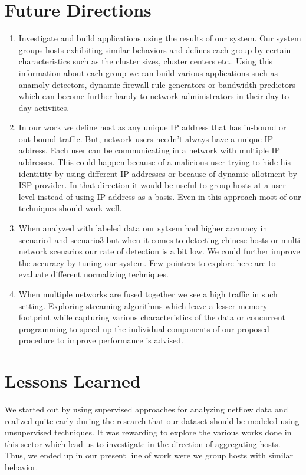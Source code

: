 \section{Future Directions}

\begin{enumerate}
	\item Investigate and build applications using the results of our system. Our system groups hosts exhibiting similar behaviors and defines each group by certain characteristics such as the cluster sizes, cluster centers etc.. Using this information about each group we can build various applications such as anamoly detectors, dynamic firewall rule generators or bandwidth predictors which can become further handy to network administrators in their day-to-day activiites.
	
	\item In our work we define host as any unique IP address that has in-bound or out-bound traffic. But, network users needn't always have a unique IP address. Each user can be communicating in a network with multiple IP addresses. This could happen because of a malicious user trying to hide his identitity by using different IP addresses or because of dynamic allotment by ISP provider. In that direction it would be useful to group hosts at a user level instead of using IP address as a basis. Even in this approach most of our techniques should work well. 
	
	\item When analyzed with labeled data our sytsem had higher accuracy in scenario1 and scenario3 but when it comes to detecting chinese hosts or multi network scenarios our rate of detection is a bit low. We could further improve the accuracy by tuning our system. Few pointers to explore here are to evaluate different normalizing techniques.
	
	\item When multiple networks are fused together we see a high  traffic in such setting. Exploring streaming algorithms \cite{} which leave a lesser memory footprint while capturing various characteristics of the data or  concurrent programming to speed up the individual components of our proposed procedure to improve performance is advised.
\end{enumerate}

\section{Lessons Learned}
We started out by using supervised approaches for analyzing netflow data and realized quite early during the research that our dataset should be modeled using unsupervised techniques. It was rewarding to explore the various works done in this sector which lead us to investigate in the direction of aggregating hosts. Thus, we ended up in our present line of work were we group hosts with similar behavior.

